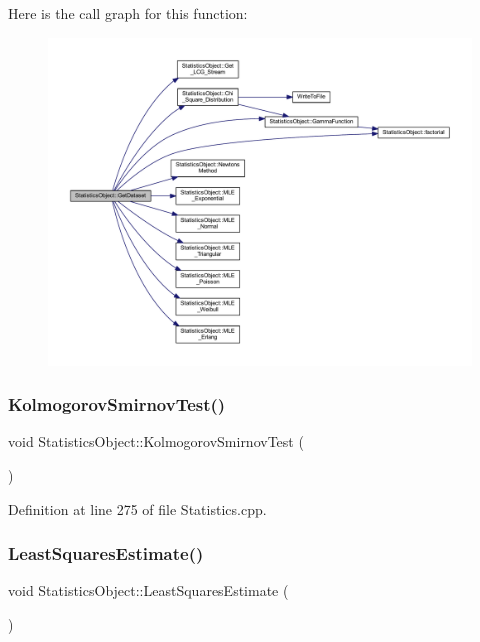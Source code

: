 Here is the call graph for this function\+:\nopagebreak
\begin{figure}[H]
\begin{center}
\leavevmode
\includegraphics[width=350pt]{class_statistics_object_a38f772ec93c2e0631cb101aff8296b54_cgraph}
\end{center}
\end{figure}
\mbox{\label{class_statistics_object_aedec675916379850f8d53897cf5386b1}} 
\subsubsection{\texorpdfstring{Kolmogorov\+Smirnov\+Test()}{KolmogorovSmirnovTest()}}
{\footnotesize\ttfamily void Statistics\+Object\+::\+Kolmogorov\+Smirnov\+Test (\begin{DoxyParamCaption}{ }\end{DoxyParamCaption})}



Definition at line 275 of file Statistics.\+cpp.

\mbox{\label{class_statistics_object_a14eb03b68eaa7a26769390ff81915a25}} 
\subsubsection{\texorpdfstring{Least\+Squares\+Estimate()}{LeastSquaresEstimate()}}
{\footnotesize\ttfamily void Statistics\+Object\+::\+Least\+Squares\+Estimate (\begin{DoxyParamCaption}{ }\end{DoxyParamCaption})}



